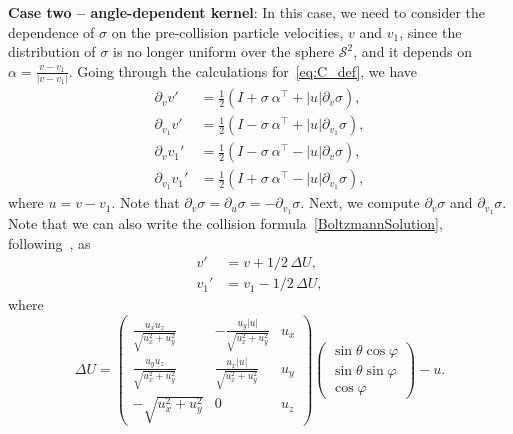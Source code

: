 \documentclass[12pt,nopreprintline]{elsarticle}
\newcommand{\cS}{\mathcal S} \newcommand{\cT}{\mathcal T}
\newcommand{\Stwo}{{\cS^2}}
\begin{document}
\textbf{Case two -- angle-dependent kernel}: In this case, we need to consider the dependence of $\sigma$ on the pre-collision particle velocities, $v$ and $v_1$, since the distribution of $\sigma$ is no longer uniform over the sphere $\Stwo$, and it depends on $\alpha = \frac{v-v_1}{|v-v_1|}$.
Going through the calculations for~\eqref{eq:C_def}, we have
\begin{align*}
 \partial_{v} v'  &=  \frac{1}{2}  \left( I + \sigma\  \alpha^\top + |u| \partial_{v} \sigma \right)  \nonumber, \\
 \partial_{v_1} v'  &=  \frac{1}{2}  \left( I - \sigma\  \alpha^\top + |u|  \partial_{v_1} \sigma\right)  \nonumber, \\
\partial_{v} {v_1'}  &= \frac{1}{2}  \left( I - \sigma\  \alpha^\top  - |u|  \partial_{v} \sigma\right)  \nonumber, \\
 \partial_{v_1} v_1'  &=  \frac{1}{2}  \left( I+\sigma \  \alpha^\top - |u|  \partial_{v_1} \sigma \right),
\end{align*}
where $u = v- v_1$.  Note that $\partial_{v} \sigma = \partial_{u} \sigma= - \partial_{v_1} \sigma$. Next, we compute $\partial_{v} \sigma$ and $\partial_{v_1} \sigma$. Note that we can also write the collision formula~\eqref{BoltzmannSolution}, following~\cite[Sec.~2.2]{wang2008particle}, as
\begin{align*}
    v' &= v  + 1/2\,\Delta U,\\
    v_1' &= v_1 - 1/2\,\Delta U,
\end{align*}
where
\begin{equation*}
    \Delta U = \begin{pmatrix}
               \frac{u_x u_z}{\sqrt{u_x^2 + u_y^2}} & -\frac{u_y |u|}{\sqrt{u_x^2 + u_y^2}} &
               u_x\\
                \frac{u_y u_z}{\sqrt{u_x^2 + u_y^2}} & \frac{u_x |u|}{\sqrt{u_x^2 + u_y^2}} &
               u_y\\
               -\sqrt{u_x^2 + u_y^2} &
               0 &
               u_z 
               \end{pmatrix}
               \begin{pmatrix}
               \sin \theta \cos \varphi\\
               \sin \theta \sin \varphi\\
               \cos \varphi
               \end{pmatrix} - u.
\end{equation*}
\end{document}
